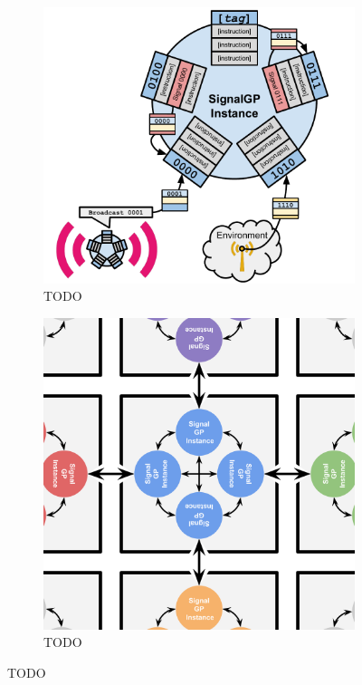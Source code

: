 \begin{figure}[t]
\begin{center}

\begin{subfigure}[b]{\columnwidth}
\includegraphics[width=\textwidth]{img/signalgp-cartoon}%
\caption{TODO}
\label{fig:signalgp-cartoon}
\end{subfigure}%
\begin{subfigure}[b]{\columnwidth}
\includegraphics[width=\textwidth]{img/dishtinygp-cartoon}
\caption{TODO}
\label{fig:dishtinygp-cartoon}
\end{subfigure}

\caption{TODO}
\label{fig:signalgp-dishtinygp}

\end{center}
\end{figure}
